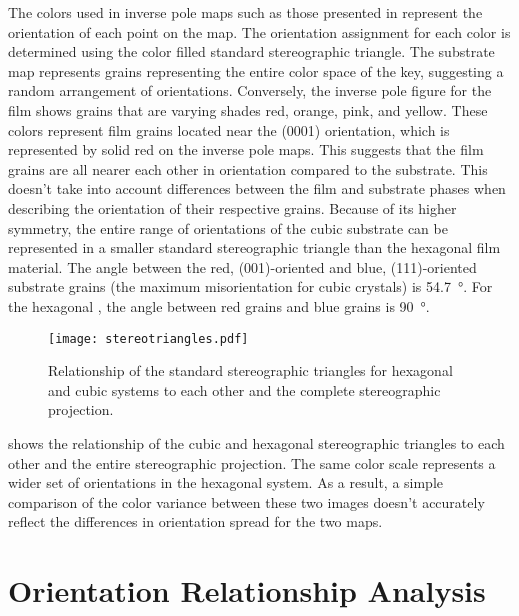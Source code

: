 The colors used in inverse pole maps such as those presented in  represent the orientation of each point on the map. The orientation assignment for each color is determined using the color filled standard stereographic triangle. The substrate map represents grains representing the entire color space of the key, suggesting a random arrangement of orientations. Conversely, the inverse pole figure for the film shows grains that are varying shades red, orange, pink, and yellow. These colors represent film grains located near the (0001) orientation, which is represented by solid red on the inverse pole maps. This suggests that the film grains are all nearer each other in orientation compared to the substrate. This doesn't take into account differences between the film and substrate phases when describing the orientation of their respective grains. Because of its higher symmetry, the entire range of orientations of the cubic substrate can be represented in a smaller standard stereographic triangle than the hexagonal film material. The angle between the red, (001)-oriented and blue, (111)-oriented substrate grains (the maximum misorientation for cubic crystals) is \SI{54.7}{\degree}. For the hexagonal \feo, the angle between red grains and blue grains is \SI{90}{\degree}. 
\begin{figure}
	\begin{center}
	\texttt{[image: stereotriangles.pdf]}
		\caption[Relationship of stereographic triangles]{%
			Relationship of the standard stereographic triangles for hexagonal
			and cubic systems to each other and the complete stereographic 
			projection.}
	\label{fig:stereotriangles}
	\end{center}
\end{figure}
 shows the relationship of the cubic and hexagonal stereographic triangles to each other and the entire stereographic projection. The same color scale represents a wider set of orientations in the hexagonal system. As a result, a simple comparison of the color variance between these two images doesn't accurately reflect the differences in orientation spread for the two maps.


\section{Orientation Relationship Analysis}
\label{sec:poly.growth.orients}


